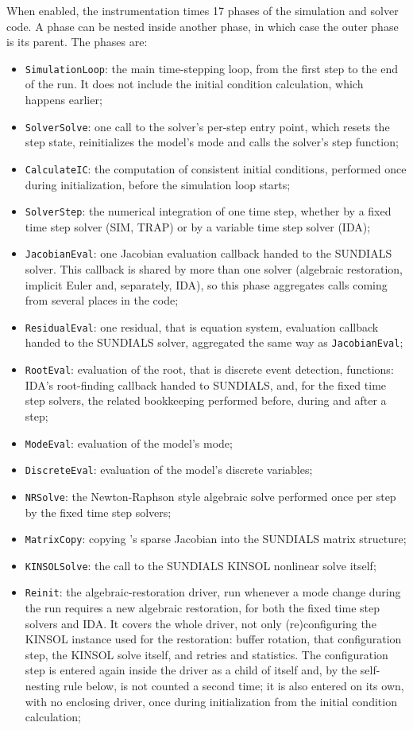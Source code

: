 \documentclass[a4paper, 12pt]{report}
\begin{document}
When enabled, the instrumentation times 17 phases of the simulation and solver code. A phase can be nested inside another phase, in which case the outer phase is its parent. The phases are:

\begin{itemize}
  \item \texttt{SimulationLoop}: the main time-stepping loop, from the first step to the end of the run. It does not include the initial condition calculation, which happens earlier;
  \item \texttt{SolverSolve}: one call to the solver's per-step entry point, which resets the step state, reinitializes the model's mode and calls the solver's step function;
  \item \texttt{CalculateIC}: the computation of consistent initial conditions, performed once during initialization, before the simulation loop starts;
  \item \texttt{SolverStep}: the numerical integration of one time step, whether by a fixed time step solver (SIM, TRAP) or by a variable time step solver (IDA);
  \item \texttt{JacobianEval}: one Jacobian evaluation callback handed to the SUNDIALS solver. This callback is shared by more than one solver (algebraic restoration, implicit Euler and, separately, IDA), so this phase aggregates calls coming from several places in the code;
  \item \texttt{ResidualEval}: one residual, that is equation system, evaluation callback handed to the SUNDIALS solver, aggregated the same way as \texttt{JacobianEval};
  \item \texttt{RootEval}: evaluation of the root, that is discrete event detection, functions: IDA's root-finding callback handed to SUNDIALS, and, for the fixed time step solvers, the related bookkeeping performed before, during and after a step;
  \item \texttt{ModeEval}: evaluation of the model's mode;
  \item \texttt{DiscreteEval}: evaluation of the model's discrete variables;
  \item \texttt{NRSolve}: the Newton-Raphson style algebraic solve performed once per step by the fixed time step solvers;
  \item \texttt{MatrixCopy}: copying \Dynawo's sparse Jacobian into the SUNDIALS matrix structure;
  \item \texttt{KINSOLSolve}: the call to the SUNDIALS KINSOL nonlinear solve itself;
  \item \texttt{Reinit}: the algebraic-restoration driver, run whenever a mode change during the run requires a new algebraic restoration, for both the fixed time step solvers and IDA. It covers the whole driver, not only (re)configuring the KINSOL instance used for the restoration: buffer rotation, that configuration step, the KINSOL solve itself, and retries and statistics. The configuration step is entered again inside the driver as a child of itself and, by the self-nesting rule below, is not counted a second time; it is also entered on its own, with no enclosing driver, once during initialization from the initial condition calculation;

\end{itemize}
\end{document}
